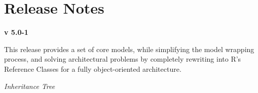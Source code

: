 \documentclass[letterpaper,10pt,english]{sphinxmanual}
\begin{document}
\section{Release Notes}
\label{about:release-notes}
\textbf{v 5.0-1}

This release provides a set of core models, while simplifying the model wrapping process, and solving architectural problems by completely rewriting into R’s Reference Classes for a fully object-oriented architecture.

\emph{Inheritance Tree}



\renewcommand{\indexname}{Index}
\printindex
\end{document}

